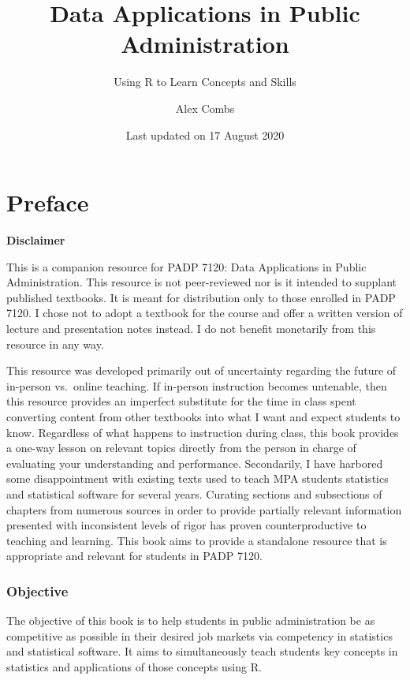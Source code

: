 \documentclass[
]{book}
\title{Data Applications in Public Administration}
\subtitle{Using R to Learn Concepts and Skills}
\author{Alex Combs}
\date{Last updated on 17 August 2020}
\newenvironment{announcement}%
{%
  \par\vspace{\baselineskip}\noindent 
  \color{Announcement}\begin{itshape}%
  \par\vspace{\baselineskip}\noindent\ignorespaces 
}%
{%
  \end{itshape}\ignorespacesafterend 
}
\begin{document}
\maketitle

{
\hypersetup{linkcolor=}
\setcounter{tocdepth}{1}
\tableofcontents
}
\hypertarget{preface}{%
\chapter*{Preface}\label{preface}}

\begin{announcement}
\textbf{Disclaimer}

This is a companion resource for PADP 7120: Data Applications in Public
Administration. This resource is not peer-reviewed nor is it intended to
supplant published textbooks. It is meant for distribution only to those
enrolled in PADP 7120. I chose not to adopt a textbook for the course
and offer a written version of lecture and presentation notes instead. I
do not benefit monetarily from this resource in any way.
\end{announcement}

This resource was developed primarily out of uncertainty regarding the future of in-person vs.~online teaching. If in-person instruction becomes untenable, then this resource provides an imperfect substitute for the time in class spent converting content from other textbooks into what I want and expect students to know. Regardless of what happens to instruction during class, this book provides a one-way lesson on relevant topics directly from the person in charge of evaluating your understanding and performance. Secondarily, I have harbored some disappointment with existing texts used to teach MPA students statistics and statistical software for several years. Curating sections and subsections of chapters from numerous sources in order to provide partially relevant information presented with inconsistent levels of rigor has proven counterproductive to teaching and learning. This book aims to provide a standalone resource that is appropriate and relevant for students in PADP 7120.

\hypertarget{objective}{%
\subsection*{Objective}\label{objective}}

The objective of this book is to help students in public administration be as competitive as possible in their desired job markets via competency in statistics and statistical software. It aims to simultaneously teach students key concepts in statistics and applications of those concepts using R.
\end{document}
